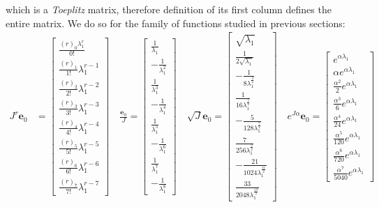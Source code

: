 which is a \textit{Toeplitz} matrix, therefore definition of its first column
defines the entire matrix. We do so for the family of functions studied in
previous sections:
\begin{displaymath}
\begin{split}
J^{r} \boldsymbol{e}_{0} &= \left[\begin{matrix}\frac{{\left(r\right)}_{0} \lambda_{1}^{r}}{0!}\\\frac{{\left(r\right)}_{1}}{1!} \lambda_{1}^{r - 1}\\\frac{{\left(r\right)}_{2}}{2!} \lambda_{1}^{r - 2}\\\frac{{\left(r\right)}_{3}}{3!} \lambda_{1}^{r - 3}\\\frac{{\left(r\right)}_{4}}{4!} \lambda_{1}^{r - 4}\\\frac{{\left(r\right)}_{5}}{5!} \lambda_{1}^{r - 5}\\\frac{{\left(r\right)}_{6}}{6!} \lambda_{1}^{r - 6}\\\frac{{\left(r\right)}_{7}}{7!} \lambda_{1}^{r - 7}\end{matrix}\right]\quad
\frac{\boldsymbol{e}_{0}}{J} = \left[\begin{matrix}\frac{1}{\lambda_{1}}\\- \frac{1}{\lambda_{1}^{2}}\\\frac{1}{\lambda_{1}^{3}}\\- \frac{1}{\lambda_{1}^{4}}\\\frac{1}{\lambda_{1}^{5}}\\- \frac{1}{\lambda_{1}^{6}}\\\frac{1}{\lambda_{1}^{7}}\\- \frac{1}{\lambda_{1}^{8}}\end{matrix}\right]\quad
\sqrt{J} \boldsymbol{e}_{0} = \left[\begin{matrix}\sqrt{\lambda_{1}}\\\frac{1}{2 \sqrt{\lambda_{1}}}\\- \frac{1}{8 \lambda_{1}^{\frac{3}{2}}}\\\frac{1}{16 \lambda_{1}^{\frac{5}{2}}}\\- \frac{5}{128 \lambda_{1}^{\frac{7}{2}}}\\\frac{7}{256 \lambda_{1}^{\frac{9}{2}}}\\- \frac{21}{1024 \lambda_{1}^{\frac{11}{2}}}\\\frac{33}{2048 \lambda_{1}^{\frac{13}{2}}}\end{matrix}\right] \quad
e^{J \alpha} \boldsymbol{e}_{0} = \left[\begin{matrix}e^{\alpha \lambda_{1}}\\\alpha e^{\alpha \lambda_{1}}\\\frac{\alpha^{2}}{2} e^{\alpha \lambda_{1}}\\\frac{\alpha^{3}}{6} e^{\alpha \lambda_{1}}\\\frac{\alpha^{4}}{24} e^{\alpha \lambda_{1}}\\\frac{\alpha^{5}}{120} e^{\alpha \lambda_{1}}\\\frac{\alpha^{6}}{720} e^{\alpha \lambda_{1}}\\\frac{\alpha^{7}}{5040} e^{\alpha \lambda_{1}}\end{matrix}\right] \\

\end{split}
\end{displaymath}
